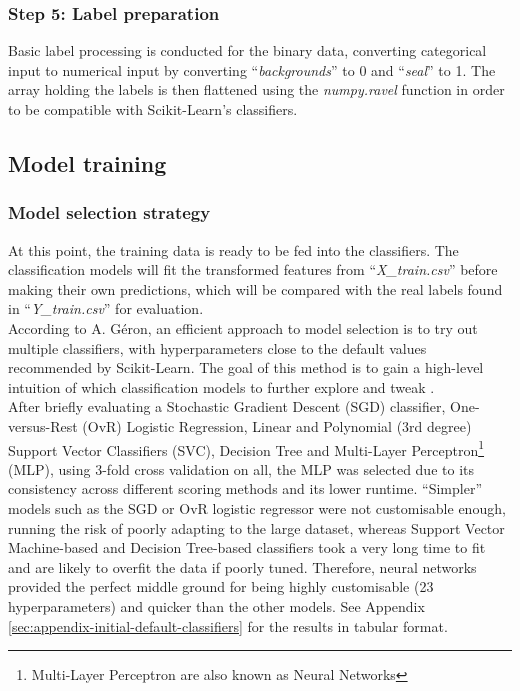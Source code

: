 \documentclass[letterpaper,12pt]{article}
\begin{document}
\subsubsection{Step 5: Label preparation}

Basic label processing is conducted for the binary data, converting categorical input to numerical input by converting ``\textit{backgrounds}'' to 0 and ``\textit{seal}'' to 1. The array holding the labels is then flattened using the \textit{numpy.ravel} function in order to be compatible with Scikit-Learn's classifiers.


\subsection{Model training}

\subsubsection{Model selection strategy}
\label{sec:initial-model-selection-strategy}

At this point, the training data is ready to be fed into the classifiers. The classification models will fit the transformed features from ``\textit{X\_train.csv}'' before making their own predictions, which will be compared with the real labels found in ``\textit{Y\_train.csv}'' for evaluation.\\

According to A. Géron, an efficient approach to model selection is to try out multiple classifiers, with hyperparameters close to the default values recommended by Scikit-Learn. The goal of this method is to gain a high-level intuition of which classification models to further explore and tweak \cite{Geron2019}.\\

After briefly evaluating a Stochastic Gradient Descent (SGD) classifier, One-versus-Rest (OvR) Logistic Regression, Linear and Polynomial (3rd degree) Support Vector Classifiers (SVC), Decision Tree and Multi-Layer Perceptron\footnote{Multi-Layer Perceptron are also known as Neural Networks} (MLP), using 3-fold cross validation on all, the MLP was selected due to its consistency across different scoring methods and its lower runtime. ``Simpler'' models such as the SGD or OvR logistic regressor were not customisable enough, running the risk of poorly adapting to the large dataset, whereas Support  Vector Machine-based and Decision Tree-based classifiers took a very long time to fit and  are likely to overfit the data if poorly tuned. Therefore, neural networks provided the perfect middle ground for being highly customisable (23 hyperparameters) and quicker than the other models. See Appendix \ref{sec:appendix-initial-default-classifiers} for the results in tabular format.
\end{document}
